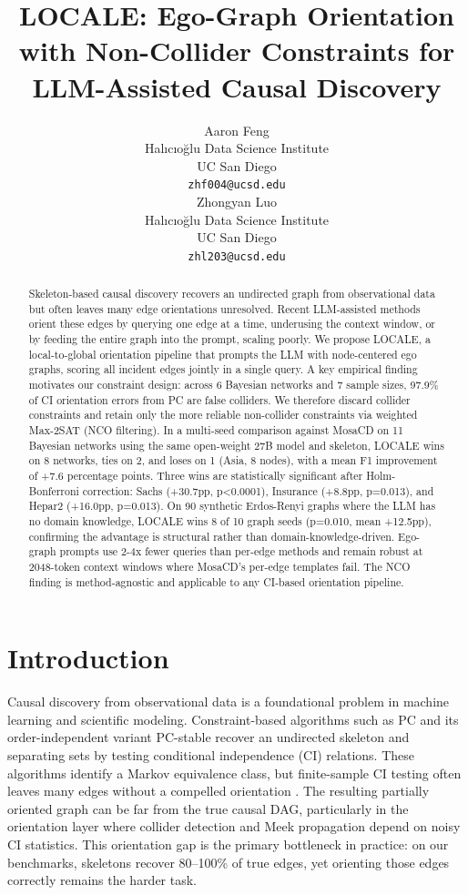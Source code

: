 \documentclass{article} %
\title{LOCALE: Ego-Graph Orientation with Non-Collider Constraints for LLM-Assisted Causal Discovery}
\author{Aaron Feng \\
Hal{\i}c{\i}o\u{g}lu Data Science Institute\\
UC San Diego\\
\texttt{zhf004@ucsd.edu} \\
\And
Zhongyan Luo \\
Hal{\i}c{\i}o\u{g}lu Data Science Institute\\
UC San Diego\\
\texttt{zhl203@ucsd.edu} \\
}
\begin{document}
\ifcolmsubmission
\linenumbers
\fi

\maketitle

\begin{abstract}
Skeleton-based causal discovery recovers an undirected graph from observational data but often leaves many edge orientations unresolved. Recent LLM-assisted methods orient these edges by querying one edge at a time, underusing the context window, or by feeding the entire graph into the prompt, scaling poorly. We propose LOCALE, a local-to-global orientation pipeline that prompts the LLM with node-centered ego graphs, scoring all incident edges jointly in a single query. A key empirical finding motivates our constraint design: across 6 Bayesian networks and 7 sample sizes, 97.9\% of CI orientation errors from PC are false colliders. We therefore discard collider constraints and retain only the more reliable non-collider constraints via weighted Max-2SAT (NCO filtering). In a multi-seed comparison against MosaCD on 11 Bayesian networks using the same open-weight 27B model and skeleton, LOCALE wins on 8 networks, ties on 2, and loses on 1 (Asia, 8 nodes), with a mean F1 improvement of +7.6 percentage points. Three wins are statistically significant after Holm-Bonferroni correction: Sachs (+30.7pp, p<0.0001), Insurance (+8.8pp, p=0.013), and Hepar2 (+16.0pp, p=0.013). On 90 synthetic Erdos-Renyi graphs where the LLM has no domain knowledge, LOCALE wins 8 of 10 graph seeds (p=0.010, mean +12.5pp), confirming the advantage is structural rather than domain-knowledge-driven. Ego-graph prompts use 2-4x fewer queries than per-edge methods and remain robust at 2048-token context windows where MosaCD's per-edge templates fail. The NCO finding is method-agnostic and applicable to any CI-based orientation pipeline.    
\end{abstract}

\section{Introduction}

Causal discovery from observational data is a foundational problem in machine learning and scientific modeling. Constraint-based algorithms such as PC \citep{spirtes2000causation} and its order-independent variant PC-stable \citep{colombo2014order} recover an undirected skeleton and separating sets by testing conditional independence (CI) relations. These algorithms identify a Markov equivalence class, but finite-sample CI testing often leaves many edges without a compelled orientation \citep{uhler2013geometry}. The resulting partially oriented graph can be far from the true causal DAG, particularly in the orientation layer where collider detection and Meek propagation \citep{meek1995causal} depend on noisy CI statistics. This orientation gap is the primary bottleneck in practice: on our benchmarks, skeletons recover 80--100\% of true edges, yet orienting those edges correctly remains the harder task.
\end{document}
